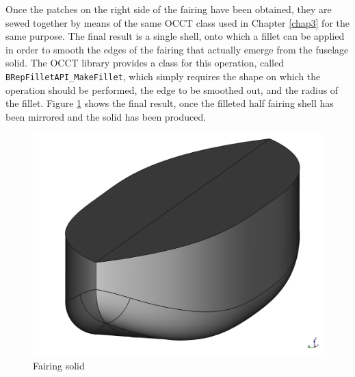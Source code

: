 \bigskip
\noindent
Once the patches on the right side of the fairing have been obtained, they are sewed together by means of the same \gls{OCCT} class used in Chapter \ref{chap3} for the same purpose. The final result is a single shell, onto which a fillet can be applied in order to smooth the edges of the fairing that actually emerge from the fuselage solid. The \gls{OCCT} library provides a class for this operation, called \lstinline[language=Java]!BRepFilletAPI_MakeFillet!, which simply requires the shape on which the operation should be performed, the edge to be smoothed out, and the radius of the fillet. Figure \ref{fig:FairingSolidPlusFillet} shows the final result, once the filleted half fairing shell has been mirrored and the solid has been produced.
%
\begin{figure}[H]
\centering
\includegraphics[scale=0.45]{Immagini/Appendice/Fairing/FairingSolidPlusFillet}
\caption{Fairing solid}
\label{fig:FairingSolidPlusFillet}
\end{figure}
%  

